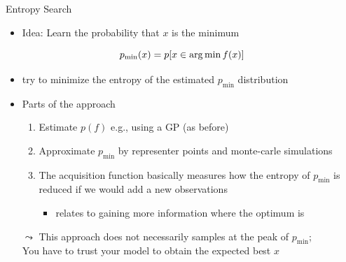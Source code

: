 \begin{frame}[c,fragile]{Entropy Search~}

\begin{itemize}
	\item Idea: Learn the probability that $x$ is the minimum
\end{itemize}

$$
p_{\text{min}}(x) = p[x \in \operatorname*{arg\,min} f(x)]
$$

\begin{itemize}
	\item try to minimize the entropy of the estimated $p_\text{min}$ distribution
	\item Parts of the approach
	\begin{enumerate}
		\item Estimate $p(f)$ e.g., using a GP (as before)
		\item Approximate $p_\text{min}$ by representer points and  monte-carle simulations
		\item The acquisition function basically measures how the entropy of $p_\text{min}$ is reduced if we would add a new observations
		\begin{itemize}
			\item relates to gaining more information where the optimum is
		\end{itemize}
	\end{enumerate}
	\pause
	\item[$\leadsto$] This approach does not necessarily samples at the peak of $p_\text{min}$;\\
	You have to trust your model to obtain the expected best $x$ 
\end{itemize}

\end{frame}
